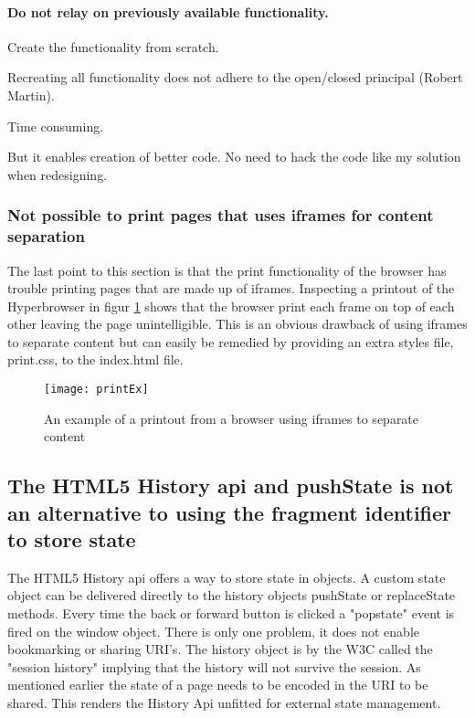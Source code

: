 \documentclass[english]{ifimaster}
\begin{document}
\paragraph{Do not relay on previously available functionality.} Create the functionality from scratch.

Recreating all functionality does not adhere to the open/closed principal (Robert Martin).

Time consuming.

But it enables creation of better code. No need to hack the code like my solution when redesigning.

\subsubsection{Not possible to print pages that uses iframes for content separation}
The last point to this section is that the print functionality of the browser has trouble printing pages that are made up of iframes. Inspecting a printout of the Hyperbrowser in figur \ref{fig:printEx} shows that the browser print each frame on top of each other leaving the page unintelligible. This is an obvious drawback of using iframes to separate content but can easily be remedied by providing an extra styles file, print.css, to the index.html file. 

\begin{figure}
\centering
\texttt{[image: printEx]}
\caption{An example of a printout from a browser using iframes to separate content}
\label{fig:printEx}
\end{figure}

\subsection{The HTML5 History api and pushState is not an alternative to using the fragment identifier to store state}
The HTML5 History api offers a way to store state in objects. A custom state object can be delivered directly to the history objects pushState or replaceState methods. Every time the back or forward button is clicked a "popstate" event is fired on the window object. There is only one problem, it does not enable bookmarking or sharing URI's. The history object is by the W3C called the "session history" implying that the history will not survive the session. As mentioned earlier the state of a page needs to be encoded in the URI to be shared. This renders the History Api unfitted for external state management.
\end{document}
